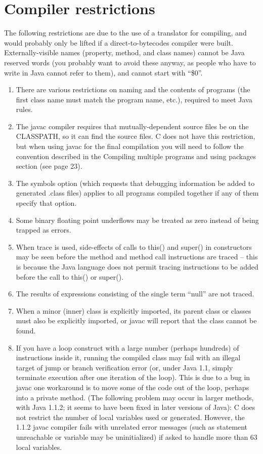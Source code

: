 \section{Compiler restrictions }
The following restrictions are due to the use of a translator for compiling, and would probably only be lifted if a direct-to-bytecodes \nr{} compiler were built. 
Externally-visible names (property, method, and class names) cannot be Java reserved words (you probably want to avoid these anyway, as people who have to write in Java cannot refer to them), and cannot start with “\$0”.
\begin{enumerate}
\item There are various restrictions on naming and the contents of programs (the first class name must match the program name, etc.), required to meet Java rules. 
\item The javac compiler requires that mutually-dependent source files be on the CLASSPATH, so it can find the source files. \nr{}C does not have this restriction, but when using javac for the final compilation you will need to follow the convention described in the Compiling multiple programs and using packages section (see page 23). 
\item The symbols option (which requests that debugging information be added to generated .class files) applies to all programs compiled together if any of them specify that option. 
\item Some binary floating point underflows may be treated as zero instead of being trapped as errors. 
\item When trace is used, side-effects of calls to this() and super() in constructors may be seen before the method and method call instructions are traced – this is because the Java language does not permit tracing instructions to be added before the call to this() or super(). 
\item The results of expressions consisting of the single term “null” are not traced. 
\item When a minor (inner) class is explicitly imported, its parent class or classes must 
also be explicitly imported, or javac will report that the class cannot be found. 
\item If you have a loop construct with a large number (perhaps hundreds) of instructions inside it, running the compiled class may fail with an illegal target of jump or branch verification error (or, under Java 1.1, simply terminate execution after one iteration of the loop). This is due to a bug in javac one workaround is to move some of the code out of the loop, perhaps into a private method. 
(The following problem may occur in larger methods, with Java 1.1.2; it seems to have been fixed in later versions of Java): \nr{}C does not restrict the number of local variables used or generated. However, the 1.1.2 javac compiler fails with unrelated error messages (such as statement unreachable or variable may be uninitialized) if asked to handle more than 63 local variables. 
\end{enumerate}
